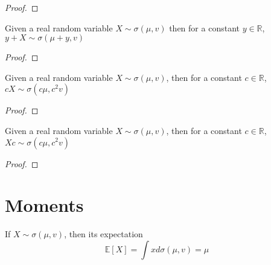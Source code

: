 \begin{proof}
  \leanok
\end{proof}


\begin{lemma}
  \label{lem:semicircleReal_const_add}
  \leanok
  Given a real random variable $X \sim \sigma(\mu, v)$
  then for a constant $y \in \mathbb{R}$, $y + X \sim \sigma(\mu + y, v)$
\end{lemma}

\begin{proof}
  \leanok
\end{proof}


\begin{lemma}
  \label{lem:semicircleReal_const_mul}
  \leanok
  Given a real random variable $X \sim \sigma(\mu, v)$,
  then for a constant $c \in \mathbb{R}$, $cX \sim \sigma(c\mu , c^2v)$
\end{lemma}

\begin{proof}
  \leanok
\end{proof}


\begin{lemma}
  \label{lem:semicircleReal_mul_const}
  \leanok
   Given a real random variable $X \sim \sigma(\mu, v)$,
  then for a constant $c \in \mathbb{R}$, $Xc \sim \sigma(c \mu  , c^2v)$
\end{lemma}

\begin{proof}
  \leanok
\end{proof}


\section{Moments}

\begin{lemma}
  \label{lem:integral_id_semicircleReal}
  \leanok
  If $X \sim \sigma(\mu, v)$, then its expectation $$\mathbb{E}[X] = \int x d \sigma(\mu, v) = \mu$$
\end{lemma}

